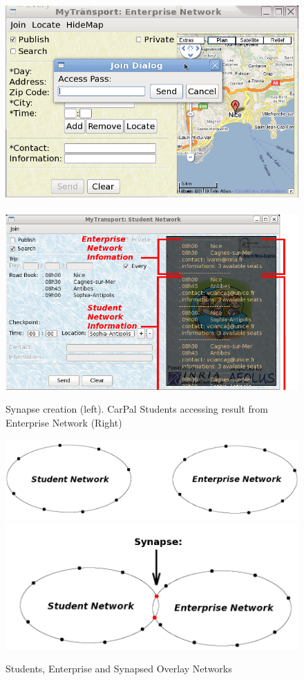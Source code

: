 \begin{figure}[!t]
\begin{center}
\mbox{\includegraphics[scale=0.3]{fig/screenshot/EnterpriseJoinStudent}~
\includegraphics[scale=0.31]{fig/screenshot/NiceCagnesAntibesSophiaSub_StudentNetwork}}
\end{center}
\caption{Synapse creation (left). CarPal Students accessing result from Enterprise Network (Right)}
\label{fig:searchForeign}
\end{figure}

 
\begin{figure}[!t]
\begin{center}
\includegraphics[scale=0.3]{fig/screenshot/Student-Enterprise}
\\[-10mm]
\includegraphics[scale=0.3]{fig/screenshot/Synapse-Network}
\end{center}
\caption{Students, Enterprise and Synapsed Overlay Networks}
\label{fig:studententerprise}
\end{figure}

 
